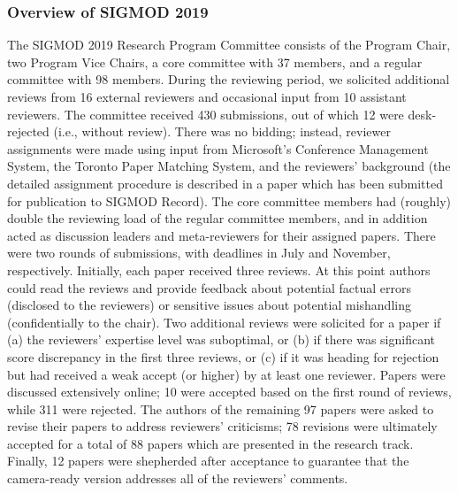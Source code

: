 \subsubsection*{Overview of SIGMOD 2019}
The SIGMOD 2019 Research Program Committee consists of the Program Chair, two Program Vice Chairs, a core committee with 37 members, and a regular committee with 98 members. During the reviewing period, we solicited additional reviews from 16 external reviewers and occasional input from 10 assistant reviewers. The committee received 430 submissions, out of which 12 were desk-rejected (i.e., without review). There was no bidding; instead, reviewer assignments were made using input from Microsoft's Conference Management System, the Toronto Paper Matching System, and the reviewers' background (the detailed assignment procedure is described in a paper which has been submitted for publication to SIGMOD Record). The core committee members had (roughly) double the reviewing load of the regular committee members, and in addition acted as discussion leaders and meta-reviewers for their assigned papers. There were two rounds of submissions, with deadlines in July and November, respectively. Initially, each paper received three reviews. At this point authors could read the reviews and provide feedback about potential factual errors (disclosed to the reviewers) or sensitive issues about potential mishandling (confidentially to the chair). Two additional reviews were solicited for a paper if (a) the reviewers' expertise level was suboptimal, or (b) if there was significant score discrepancy in the first three reviews, or (c) if it was heading for rejection but had received a weak accept (or higher) by at least one reviewer. Papers were discussed extensively online; 10 were accepted based on the first round of reviews, while 311 were rejected. The authors of the remaining 97 papers were asked to revise their papers to address reviewers' criticisms; 78 revisions were ultimately accepted for a total of 88 papers which are presented in the research track. Finally, 12 papers were shepherded after acceptance to guarantee that the camera-ready version addresses all of the reviewers' comments.

